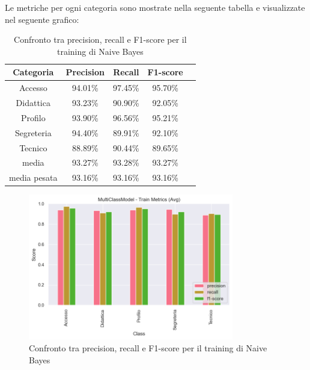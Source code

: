 \newpage

Le metriche per ogni categoria sono mostrate nella seguente tabella e visualizzate nel seguente grafico:

\begin{table}[H]
    \centering
    \begin{tabular}{|c|c|c|c|c|}
        \hline
        \textbf{Categoria} & \textbf{Precision} & \textbf{Recall} & \textbf{F1-score} \\
        \hline
        Accesso & 94.01\% & 97.45\% & 95.70\% \\
        \hline
        Didattica & 93.23\% & 90.90\% & 92.05\% \\
        \hline
        Profilo & 93.90\% & 96.56\% & 95.21\% \\
        \hline
        Segreteria & 94.40\% & 89.91\% & 92.10\% \\
        \hline
        Tecnico & 88.89\% & 90.44\% & 89.65\% \\
        \hline
        media & 93.27\% & 93.28\% & 93.27\% \\
        \hline
        media pesata & 93.16\% & 93.16\% & 93.16\% \\
        \hline
    \end{tabular}
    \caption{Confronto tra precision, recall e F1-score per il training di Naive Bayes}
    \label{tab:metriche_naive_bayes_train}
\end{table}

\begin{figure}[H]
    \centering
    \includegraphics[width=0.8\textwidth]{images/metrics_train_naive_bayes.png}
    \caption{Confronto tra precision, recall e F1-score per il training di Naive Bayes}
    \label{fig:metrics_train_naive_bayes}
\end{figure}

